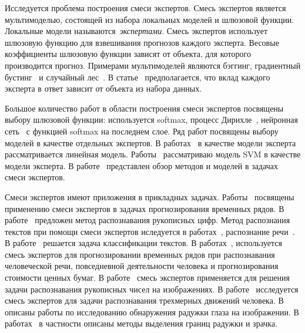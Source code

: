 Исследуется проблема построения смеси экспертов.
Смесь экспертов является мультимоделью, состоящей из набора локальных моделей и шлюзовой функции.
Локальные модели называются~\textit{экспертами}.
Смесь экспертов использует шлюзовую функцию для взвешивания прогнозов каждого эксперта.
Весовые коэффициенты шлюзовую функции зависят от объекта, для которого производится прогноз.
Примерами мультимоделей являются бэггинг, градиентный бустинг~\cite{Tianqi2016} и случайный лес~\cite{Ishwaran2012}.
В статье~\cite{Yuksel2012} предполагается, что вклад каждого эксперта в ответ зависит от объекта из набора данных.

Большое количество работ в области построения смеси экспертов посвящены выбору шлюзовой функции: используется softmax, процесс Дирихле~\cite{Edward2002}, нейронная сеть~\cite{Shazeer2017} с функцией softmax на последнем слое. Ряд работ посвящены выбору моделей в качестве отдельных экспертов. В работах~\cite{Jordan1994, Jordan1991} в качестве модели эксперта рассматривается линейная модель.
Работы~\cite{Lima2007, Cao2003} рассматриваю модель SVM в качестве модели эксперта.
В работе~\cite{Yuksel2012} представлен обзор методов и моделей в задачах смеси экспертов.

Смеси экспертов имеют приложения в прикладных задачах. Работы~\cite{Yumlu2003, Cheung1995, Weigend2000} посвящены применению смеси экспертов в задачах прогнозирования временных рядов. 
В работе~\cite{Ebrahimpour2009} предложен метод распознавания рукописных цифр. 
Метод распознания текстов при помощи смеси экспертов иследуется в работах~\cite{Estabrooks2001}, распознание речи~\cite{Mossavat2010, Peng1996, Tuerk2001}.
В работе~\cite{Estabrooks2001} решается задача классификации текстов.
В работах~\cite{Cheung1995,Weigend2000,Cao2003,Mossavat2010,Sminchisescu2007,Tuerk2001,Yumlu2003}, используется смесь экспертов для прогнозировании временных рядов при распознавания человеческой речи, повседневной деятельности человека и прогнозирования стоимости ценных бумаг.
В работе~\cite{Ebrahimpour2009} смесь экспертов применяется для решения задачи распознавания рукописных чисел на изображениях.
В работе~\cite{Sminchisescu2007} исследуется смесь экспертов для задачи распознавания трехмерных движений человека. 
В~\cite{Bowyer2010} описаны работы по исследованию обнаружения радужки глаза на изображении. В работах~\cite{Matveev2010, Matveev2014} в частности описаны методы выделения границ радужки и зрачка.